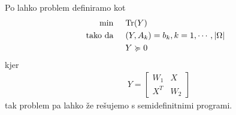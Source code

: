 Po \cite{CR08} lahko problem definiramo kot
\begin{align*}
  \min    & \hspace{0.5cm} \text{Tr}(Y)                                    \\
  \text{tako da} & \hspace{0.5cm} (Y, A_k) = b_k, k = 1, \cdots , |\Omega| \\
                    & \hspace{0.5cm} Y \succcurlyeq 0
\end{align*}
kjer
\begin{align*}
  &Y = \begin{bmatrix}
    W_1 & X   \\
    X^T & W_2
  \end{bmatrix}
\end{align*} tak problem pa lahko že rešujemo s semidefinitnimi programi.






